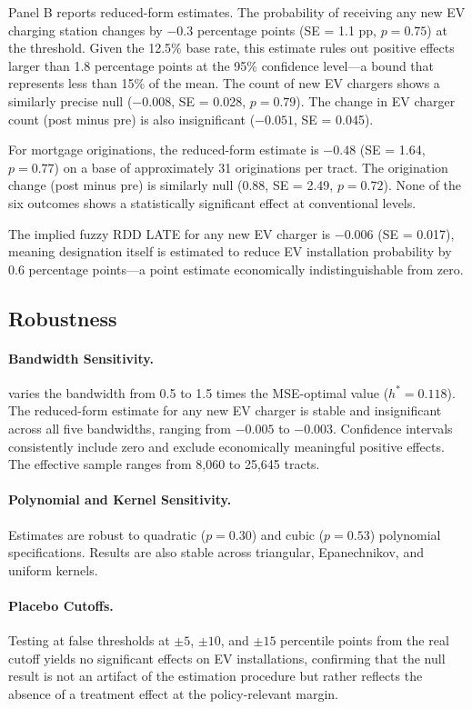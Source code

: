 \documentclass[12pt]{article}
\begin{document}
Panel B reports reduced-form estimates. The probability of receiving any new EV charging station changes by $-0.3$ percentage points (SE = 1.1 pp, $p = 0.75$) at the threshold. Given the 12.5\% base rate, this estimate rules out positive effects larger than 1.8 percentage points at the 95\% confidence level---a bound that represents less than 15\% of the mean. The count of new EV chargers shows a similarly precise null ($-0.008$, SE = 0.028, $p = 0.79$). The change in EV charger count (post minus pre) is also insignificant ($-0.051$, SE = 0.045).

For mortgage originations, the reduced-form estimate is $-0.48$ (SE = 1.64, $p = 0.77$) on a base of approximately 31 originations per tract. The origination change (post minus pre) is similarly null (0.88, SE = 2.49, $p = 0.72$). None of the six outcomes shows a statistically significant effect at conventional levels.

The implied fuzzy RDD LATE for any new EV charger is $-0.006$ (SE = 0.017), meaning designation itself is estimated to reduce EV installation probability by 0.6 percentage points---a point estimate economically indistinguishable from zero.

\subsection{Robustness}



\paragraph{Bandwidth Sensitivity.}  varies the bandwidth from 0.5 to 1.5 times the MSE-optimal value ($h^* = 0.118$). The reduced-form estimate for any new EV charger is stable and insignificant across all five bandwidths, ranging from $-0.005$ to $-0.003$. Confidence intervals consistently include zero and exclude economically meaningful positive effects. The effective sample ranges from 8,060 to 25,645 tracts.

\paragraph{Polynomial and Kernel Sensitivity.} Estimates are robust to quadratic ($p = 0.30$) and cubic ($p = 0.53$) polynomial specifications. Results are also stable across triangular, Epanechnikov, and uniform kernels.

\paragraph{Placebo Cutoffs.} Testing at false thresholds at $\pm 5$, $\pm 10$, and $\pm 15$ percentile points from the real cutoff yields no significant effects on EV installations, confirming that the null result is not an artifact of the estimation procedure but rather reflects the absence of a treatment effect at the policy-relevant margin.
\end{document}
